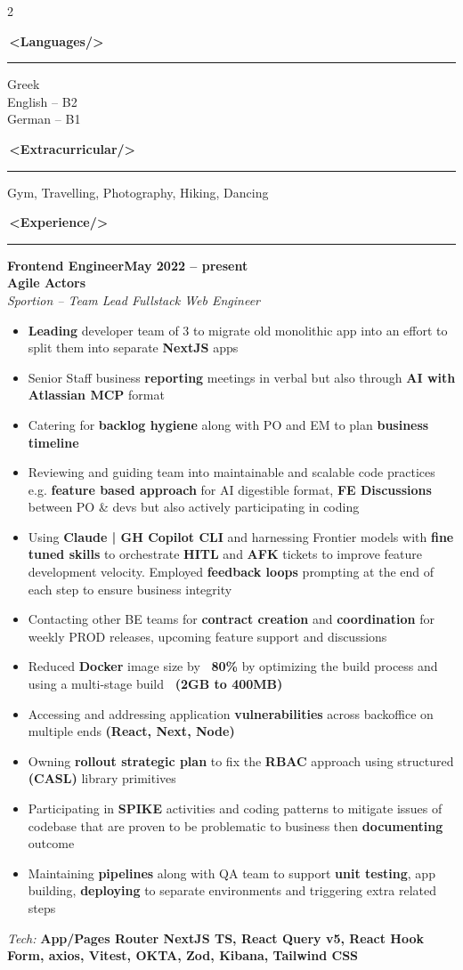 \documentclass[10pt,a4paper]{article}
\newcommand{\faBicycle}{}%
\newcommand{\faGlobe}{}%
\newcommand{\faBriefcase}{}%
\newcommand{\xmlsection}[2][]{%
    \par\vspace{6pt}%
    {\Large\bfseries\color{accent}#1\,\textless#2/\textgreater}%
    \par\vspace{2pt}%
    {\color{accent}\rule{\linewidth}{0.6pt}}\par\vspace{4pt}%
}
\newcommand{\xmlsidesection}[2][]{%
    \par\vspace{6pt}%
    {\large\bfseries\color{accent}#1\,\textless#2/\textgreater}%
    \par\vspace{2pt}%
    {\color{accent}\rule{\linewidth}{0.5pt}}\par\vspace{2pt}%
}
\newcommand{\jobentry}[4]{%
    \par\vspace{4pt}%
    \noindent\textbf{#1}\hfill\textbf{#2}\\%
    \textbf{#3}\\%
    \textit{#4}\par\vspace{2pt}%
}
\newenvironment{cvitems}{%
    \begin{itemize}[leftmargin=1.1em,topsep=2pt,itemsep=1pt,parsep=0pt]%
}{%
    \end{itemize}%
}
\newcommand{\techstack}[1]{%
    \vspace{2pt}\noindent\textit{Tech:} \textbf{#1}\par%
}
\begin{document}
\begin{paracol}{2}
\xmlsidesection[\faGlobe]{Languages}
Greek\\
English -- B2\\
German -- B1

\xmlsidesection[\faBicycle]{Extracurricular}
Gym, Travelling, Photography, Hiking, Dancing

\switchcolumn

\xmlsection[\faBriefcase]{Experience}

\jobentry{Frontend Engineer}{May 2022 -- present}{Agile Actors}{Sportion -- Team Lead Fullstack Web Engineer}
\begin{cvitems}
    \item \textbf{Leading} developer team of 3 to migrate old monolithic app into an effort to split them into separate \textbf{NextJS} apps
    \item Senior Staff business \textbf{reporting} meetings in verbal but also through \textbf{AI with Atlassian MCP} format
    \item Catering for \textbf{backlog hygiene} along with PO and EM to plan \textbf{business timeline}
    \item Reviewing and guiding team into maintainable and scalable code practices e.g. \textbf{feature based approach} for AI digestible format, \textbf{FE Discussions} between PO \& devs but also actively participating in coding
    \item Using \textbf{Claude | GH Copilot CLI} and harnessing Frontier models with \textbf{fine tuned skills} to orchestrate \textbf{HITL} and \textbf{AFK} tickets to improve feature development velocity. Employed \textbf{feedback loops} prompting at the end of each step to ensure business integrity
    \item Contacting other BE teams for \textbf{contract creation} and \textbf{coordination} for weekly PROD releases, upcoming feature support and discussions
    \item Reduced \textbf{Docker} image size by \textbf{~80\%} by optimizing the build process and using a multi-stage build \textbf{~(2GB to 400MB)}
    \item Accessing and addressing application \textbf{vulnerabilities} across backoffice on multiple ends \textbf{(React, Next, Node)}
    \item Owning \textbf{rollout strategic plan} to fix the \textbf{RBAC} approach using structured \textbf{(CASL)} library primitives
    \item Participating in \textbf{SPIKE} activities and coding patterns to mitigate issues of codebase that are proven to be problematic to business then \textbf{documenting} outcome
    \item Maintaining \textbf{pipelines} along with QA team to support \textbf{unit testing}, app building, \textbf{deploying} to separate environments and triggering extra related steps
\end{cvitems}
\techstack{App/Pages Router NextJS TS, React Query v5, React Hook Form, axios, Vitest, OKTA, Zod, Kibana, Tailwind CSS}


\end{paracol}
\end{document}
